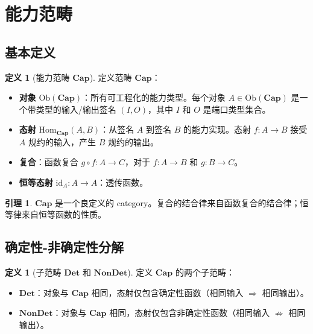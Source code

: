 \documentclass[11pt,a4paper]{article}
\theoremstyle{definition}
\newtheorem{lemma}[theorem]{引理}
\theoremstyle{definition}
\newtheorem{definition}[theorem]{定义}
\theoremstyle{remark}
\newcommand{\cat}[1]{\mathbf{#1}}
\newcommand{\catCap}{\cat{Cap}}
\newcommand{\catDet}{\cat{Det}}
\newcommand{\catNonDet}{\cat{NonDet}}
\newcommand{\id}{\mathrm{id}}
\newcommand{\ob}[1]{\mathrm{Ob}(#1)}
\newcommand{\homset}[3]{\mathrm{Hom}_{#1}(#2, #3)}
\begin{document}
\tableofcontents

\section{能力范畴}

\subsection{基本定义}

\begin{definition}[能力范畴 $\catCap$]
定义范畴 $\catCap$：
\begin{itemize}[leftmargin=2em]
    \item \textbf{对象} $\ob{\catCap}$：所有可工程化的能力类型。每个对象 $A \in \ob{\catCap}$ 是一个带类型的输入/输出签名 $(I, O)$，其中 $I$ 和 $O$ 是端口类型集合。
    \item \textbf{态射} $\homset{\catCap}{A}{B}$：从签名 $A$ 到签名 $B$ 的能力实现。态射 $f: A \to B$ 接受 $A$ 规约的输入，产生 $B$ 规约的输出。
    \item \textbf{复合}：函数复合 $g \circ f: A \to C$，对于 $f: A \to B$ 和 $g: B \to C$。
    \item \textbf{恒等态射} $\id_A: A \to A$：透传函数。
\end{itemize}
\end{definition}

\begin{lemma}
$\catCap$ 是一个良定义的 category。复合的结合律来自函数复合的结合律；恒等律来自恒等函数的性质。
\end{lemma}

\subsection{确定性-非确定性分解}

\begin{definition}[子范畴 $\catDet$ 和 $\catNonDet$]
定义 $\catCap$ 的两个子范畴：
\begin{itemize}
    \item $\catDet$：对象与 $\catCap$ 相同，态射仅包含确定性函数（相同输入 $\Rightarrow$ 相同输出）。
    \item $\catNonDet$：对象与 $\catCap$ 相同，态射仅包含非确定性函数（相同输入 $\not\Rightarrow$ 相同输出）。
\end{itemize}
\end{definition}
\end{document}
